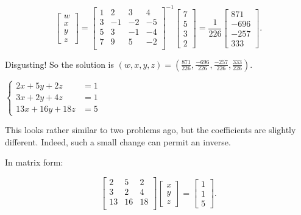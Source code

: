 \documentclass[../gatm_answers.tex]{subfiles}
\begin{document}
$$\begin{bmatrix} w \\ x \\ y \\ z \end{bmatrix} = \begin{bmatrix}
1 & 2 & 3 & 4 \\
3 & -1 & -2 & -5 \\
5 & 3 & -1 & -4 \\
7 & 9 & 5 & -2 \\
\end{bmatrix}^{-1}\begin{bmatrix}
  7 \\ 5 \\ 3 \\ 2
\end{bmatrix} = \frac{1}{226} \begin{bmatrix} 871 \\ -696 \\ -257 \\ 333 \end{bmatrix}.$$

Disgusting! So the solution is $(w,x,y,z)=\left(\frac{871}{226},\frac{-696}{226},\frac{-257}{226},\frac{333}{226}\right)$.

\begin{inner_problem}
\item $\begin{cases} 2x+5y+2z &= 1 \\ 3x+2y+4z &= 1 \\ 13x+16y+18z &= 5 \end{cases}$
\end{inner_problem}

This looks rather similar to two problems ago, but the coefficients are slightly different. Indeed, such a small change can permit an inverse.

In matrix form:

$$\begin{bmatrix}
2 & 5 & 2 \\
3 & 2 & 4 \\
13 & 16 & 18 \\
\end{bmatrix}\begin{bmatrix}
x \\ y \\ z \end{bmatrix}
= \begin{bmatrix} 1 \\ 1 \\ 5 \end{bmatrix}.$$
\end{document}
